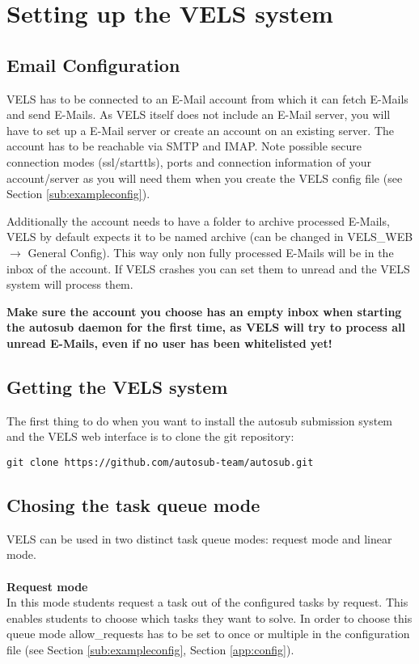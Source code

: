 \section{Setting up the VELS system} \label{system_setup}

\subsection{Email Configuration} \label{sub:emailconfig}
VELS has to be connected to an E-Mail account from which it can fetch E-Mails and send E-Mails. 
As VELS itself does not include an E-Mail server, you will have to set up a E-Mail server or
create an account on an existing server. The account has to be reachable via SMTP and IMAP.
Note possible secure connection modes (ssl/starttls), ports and connection information of 
your account/server as you will need them when you create the VELS config file (see 
Section \ref{sub:exampleconfig}).

Additionally the account needs to have a folder to archive processed E-Mails, VELS by default
expects it to be named archive (can be changed in VELS\_WEB $\rightarrow$ General Config). This way
only non fully processed E-Mails will be in the inbox of the account. If VELS crashes
you can set them to unread and the VELS system will process them.

\textbf{Make sure the account you choose has an empty inbox when starting the autosub daemon for the 
first time, as VELS will try to process all unread E-Mails, even if no user has been whitelisted yet!}

\subsection{Getting the VELS system} \label{sub:serversetup}

The first thing to do when you want to install the autosub submission system and the VELS
web interface is to clone the git repository:

\begin{verbatim}
git clone https://github.com/autosub-team/autosub.git
\end{verbatim}

\subsection{Chosing the task queue mode} \label{sub:task_queues}
VELS can be used in two distinct task queue modes: request mode and linear mode. \\
\\
\textbf{Request mode}\\
In this mode students request a task out of the configured tasks by request. This enables students to
choose which tasks they want to solve. In order to choose this queue mode allow\_requests has to be set to 
once or multiple in the configuration file (see Section \ref{sub:exampleconfig}, Section \ref{app:config}).\\
\\

